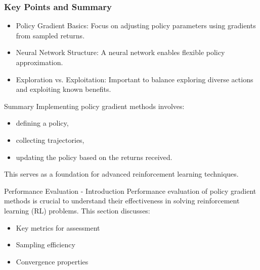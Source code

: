 \documentclass[aspectratio=169]{beamer}
\begin{document}
\begin{frame}
    \frametitle{Key Points and Summary}
    \begin{itemize}
        \item Policy Gradient Basics:
        Focus on adjusting policy parameters using gradients from sampled returns.
        \item Neural Network Structure:
        A neural network enables flexible policy approximation.
        \item Exploration vs. Exploitation:
        Important to balance exploring diverse actions and exploiting known benefits.
    \end{itemize}
    
    \begin{block}{Summary}
        Implementing policy gradient methods involves:
        \begin{itemize}
            \item defining a policy,
            \item collecting trajectories,
            \item updating the policy based on the returns received.
        \end{itemize}
        This serves as a foundation for advanced reinforcement learning techniques.
    \end{block}
\end{frame}

\begin{frame}[fragile]{Performance Evaluation - Introduction}
    Performance evaluation of policy gradient methods is crucial to understand their effectiveness in solving reinforcement learning (RL) problems. This section discusses:
    \begin{itemize}
        \item Key metrics for assessment
        \item Sampling efficiency
        \item Convergence properties
    \end{itemize}
\end{frame}
\end{document}
